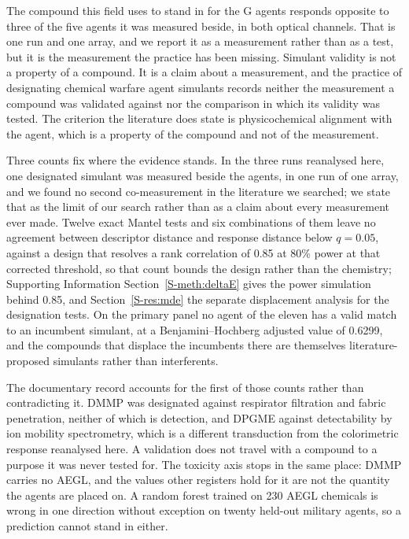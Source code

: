 \documentclass[journal=jacsat,manuscript=article,margin=1in]{achemso}
\begin{document}
The compound this field uses to stand in for the G agents responds opposite
to three of the five agents it was measured beside, in both optical channels.
That is one run and one array, and we report it as a measurement rather than
as a test, but it is the measurement the practice has been missing. Simulant
validity is not a property of a compound. It is a claim about a measurement,
and the practice of designating chemical warfare agent simulants records
neither the measurement a compound was validated against nor the comparison
in which its validity was tested. The criterion the
literature does state is physicochemical alignment with the
agent,\cite{webb2025} which is a property of the compound and not of the
measurement.

Three counts fix where the evidence stands. In the three runs reanalysed
here, one designated simulant was measured beside the agents, in one run of
one array, and we found no second co-measurement in the literature we
searched; we state that as the limit of our search rather than as a claim
about every measurement ever made. Twelve exact Mantel tests and six
combinations of them leave no agreement between descriptor distance and
response distance below $q=0.05$, against a design that resolves a rank
correlation of 0.85 at 80\% power at that corrected threshold, so that count
bounds the design rather than the chemistry; Supporting Information
Section~\ref{S-meth:deltaE} gives the power simulation behind 0.85, and
Section~\ref{S-res:mde} the separate displacement analysis for the
designation tests. On the
primary panel no agent of the
eleven has a valid match to an incumbent simulant, at a
Benjamini--Hochberg adjusted value of 0.6299, and the compounds that
displace the incumbents there are themselves literature-proposed simulants
rather than interferents.

The documentary record accounts for the first of those counts rather than
contradicting it. DMMP was designated against respirator filtration
and fabric penetration, neither of which is detection, and DPGME against
detectability by ion mobility spectrometry, which is a different transduction
from the colorimetric response reanalysed here. A validation does not travel
with a compound to a purpose it was never tested for. The toxicity axis stops
in the same place: DMMP carries no AEGL, and the values other registers hold
for it are not the quantity the agents are placed on. A random forest trained
on 230 AEGL chemicals is wrong in one direction without exception on twenty
held-out military agents, so a prediction cannot stand in either.
\end{document}
